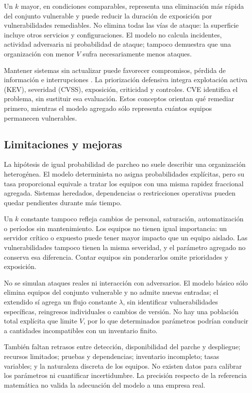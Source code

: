 \documentclass[11pt,a4paper]{article}
\begin{document}
Un $k$ mayor, en condiciones comparables, representa una eliminación más rápida del conjunto vulnerable y puede reducir la duración de exposición por vulnerabilidades remediables. No elimina todas las vías de ataque: la superficie incluye otros servicios y configuraciones. El modelo no calcula incidentes, actividad adversaria ni probabilidad de ataque; tampoco demuestra que una organización con menor $V$ sufra necesariamente menos ataques.

Mantener sistemas sin actualizar puede favorecer compromisos, pérdida de información e interrupciones \parencite{nist}. La priorización defensiva integra explotación activa (KEV), severidad (CVSS), exposición, criticidad y controles. CVE identifica el problema, sin sustituir esa evaluación. Estos conceptos orientan qué remediar primero, mientras el modelo agregado sólo representa cuántos equipos permanecen vulnerables.

\subsection{Limitaciones y mejoras}
La hipótesis de igual probabilidad de parcheo no suele describir una organización heterogénea. El modelo determinista no asigna probabilidades explícitas, pero su tasa proporcional equivale a tratar los equipos con una misma rapidez fraccional agregada. Sistemas heredados, dependencias o restricciones operativas pueden quedar pendientes durante más tiempo.

Un $k$ constante tampoco refleja cambios de personal, saturación, automatización o períodos sin mantenimiento. Los equipos no tienen igual importancia: un servidor crítico o expuesto puede tener mayor impacto que un equipo aislado. Las vulnerabilidades tampoco tienen la misma severidad, y el parámetro agregado no conserva esa diferencia. Contar equipos sin ponderarlos omite prioridades y exposición.

No se simulan ataques reales ni interacción con adversarios. El modelo básico sólo elimina equipos del conjunto vulnerable y no admite nuevas entradas; el extendido sí agrega un flujo constante $\lambda$, sin identificar vulnerabilidades específicas, reingresos individuales o cambios de versión. No hay una población total explícita que limite $V$, por lo que determinados parámetros podrían conducir a cantidades incompatibles con un inventario finito.

También faltan retrasos entre detección, disponibilidad del parche y despliegue; recursos limitados; pruebas y dependencias; inventario incompleto; tasas variables; y la naturaleza discreta de los equipos. No existen datos para calibrar los parámetros ni cuantificar incertidumbre. La precisión respecto de la referencia matemática no valida la adecuación del modelo a una empresa real.
\end{document}
